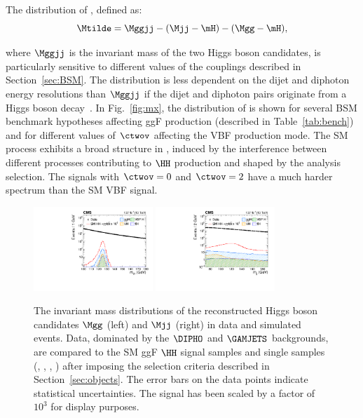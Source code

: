 \documentclass[11pt,a4paper,cmspaper,final,collab]{cms-tdr}
\begin{document}
The distribution of \Mtilde, defined as:
\begin{equation}
\Mtilde = \Mggjj - (\Mjj - \mH) - (\Mgg - \mH),
\end{equation}

where $\Mggjj$ is the invariant mass of the two Higgs boson candidates, is particularly sensitive to different values of the couplings described in Section~\ref{sec:BSM}.
The \Mtilde distribution is less dependent on the dijet and diphoton energy resolutions than $\Mggjj$ if the dijet and diphoton pairs originate from a Higgs boson decay~\cite{Kumar:2014bca}. 
In Fig.~\ref{fig:mx}, the distribution of \Mtilde is shown for several BSM benchmark hypotheses affecting ggF \HH production (described in Table~\ref{tab:bench}) and for different values of $\ctwov$ affecting the VBF \HH production mode. The SM \HH process exhibits a broad structure in \Mtilde, induced by the interference between different processes contributing to $\HH$ production and shaped by the analysis selection. The signals with $\ctwov=0$ and $\ctwov=2$ have a much harder spectrum than the SM VBF \HH signal.

\begin{figure}[hbt!]
\centering
\includegraphics[width=0.4\textwidth]{Figure_003-a.pdf}
\includegraphics[width=0.4\textwidth]{Figure_003-b.pdf}
\caption{ 
The invariant mass distributions of the reconstructed Higgs boson candidates $\Mgg$ (left) and $\Mjj$ (right)
 in data and simulated events. Data, dominated by the $\DIPHO$ and $\GAMJETS$ backgrounds, are compared to the SM ggF $\HH$ signal samples and single \PH samples (\ttH, \ggH, \VBFH, \VH) after imposing the selection criteria described in Section~\ref{sec:objects}. The error bars on the data points indicate statistical uncertainties. The \HH signal has been scaled by a factor of $10^{3}$ for display purposes. }
\label{fig:masses}\end{figure}
\end{document}
